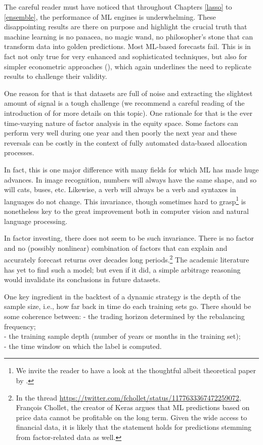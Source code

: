 \documentclass[]{krantz}
\let\rmarkdownfootnote\footnote%
\def\footnote{\protect\rmarkdownfootnote}
\theoremstyle{definition}
\theoremstyle{definition}
\theoremstyle{definition}
\theoremstyle{remark}
\begin{document}
The careful reader must have noticed that throughout Chapters
\ref{lasso} to \ref{ensemble}, the performance of ML engines is
underwhelming. These disappointing results are there on purpose and
highlight the crucial truth that machine learning is no panacea, no
magic wand, no philosopher's stone that can transform data into golden
predictions. Most ML-based forecasts fail. This is in fact not only true
for very enhanced and sophisticated techniques, but also for simpler
econometric approaches (\citet{dichtl2019data}), which again underlines
the need to replicate results to challenge their validity.

One reason for that is that datasets are full of noise and extracting
the slightest amount of signal is a tough challenge (we recommend a
careful reading of the introduction of \citet{timmermann2018forecasting}
for more details on this topic). One rationale for that is the ever
time-varying nature of factor analysis in the equity space. Some factors
can perform very well during one year and then poorly the next year and
these reversals can be costly in the context of fully automated
data-based allocation processes.

In fact, this is one major difference with many fields for which ML has
made huge advances. In image recognition, numbers will always have the
same shape, and so will cats, buses, etc. Likewise, a verb will always
be a verb and syntaxes in languages do not change. This invariance,
though sometimes hard to grasp\footnote{We invite the reader to have a
  look at the thoughtful albeit theoretical paper by
  \citet{arjovsky2019invariant}.} is nonetheless key to the great
improvement both in computer vision and natural language processing.

In factor investing, there does not seem to be such invariance. There is
no factor and no (possibly nonlinear) combination of factors that can
explain and accurately forecast returns over decades long
periods.\footnote{In the thread
  \url{https://twitter.com/fchollet/status/1177633367472259072},
  François Chollet, the creator of Keras argues that ML predictions
  based on price data cannot be profitable on the long term. Given the
  wide access to financial data, it is likely that the statement holds
  for predictions stemming from factor-related data as well.} The
academic literature has yet to find such a model; but even if it did, a
simple arbitrage reasoning would invalidate its conclusions in future
datasets.

One key ingredient in the backtest of a dynamic strategy is the depth of
the sample size, i.e., how far back in time do each training sets go.
There should be some coherence between: - the trading horizon determined
by the rebalancing frequency;\\
- the training sample depth (number of years or months in the training
set);\\
- the time window on which the label is computed.
\end{document}

